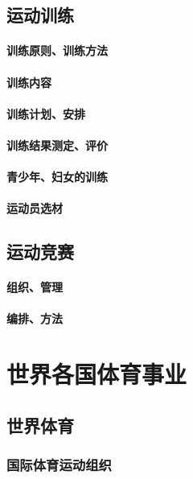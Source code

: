 \documentclass[UTF8]{../../ApplicationUniverse}
\begin{document}
\section{运动训练}
    \subsubsection{训练原则、训练方法}
    \subsubsection{训练内容}
    \subsubsection{训练计划、安排}
    \subsubsection{训练结果测定、评价}
    \subsubsection{青少年、妇女的训练}
    \subsubsection{运动员选材}
\section{运动竞赛}
    \subsubsection{组织、管理}
    \subsubsection{编排、方法}










\chapter{世界各国体育事业}


\section{世界体育}
    \subsection{国际体育运动组织}
\end{document}
